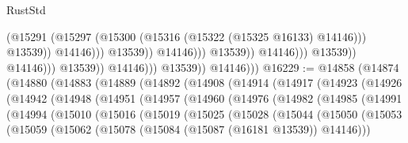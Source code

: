 \begin{lexlean}{RustStd}
\begin{coremodule}
                                                            (@15291
                                                              (@15297
                                                                (@15300
                                                                  (@15316
                                                                    (@15322
                                                                      (@15325 @16133)
                                                                      @14146)))
                                                                @13539))
                                                            @14146)))
                                                      @13539))
                                                  @14146)))
                                            @13539))
                                        @14146)))
                                  @13539))
                              @14146)))
                        @13539))
                    @14146)))
              @13539))
          @14146)))
@16229 := @14858
    (@14874
      (@14880
        (@14883
          (@14889
            (@14892
              (@14908
                (@14914
                  (@14917
                    (@14923
                      (@14926
                        (@14942
                          (@14948
                            (@14951
                              (@14957
                                (@14960
                                  (@14976
                                    (@14982
                                      (@14985
                                        (@14991
                                          (@14994
                                            (@15010
                                              (@15016
                                                (@15019
                                                  (@15025
                                                    (@15028
                                                      (@15044
                                                        (@15050
                                                          (@15053
                                                            (@15059
                                                              (@15062
                                                                (@15078
                                                                  (@15084
                                                                    (@15087 (@16181 @13539))
                                                                    @14146)))

\end{coremodule}
\end{lexlean}
